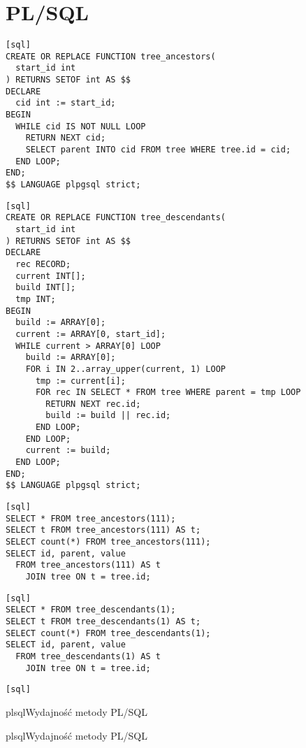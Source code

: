 \section{PL/SQL}






\begin{verbatim}[sql]
CREATE OR REPLACE FUNCTION tree_ancestors(
  start_id int
) RETURNS SETOF int AS $$
DECLARE
  cid int := start_id;
BEGIN
  WHILE cid IS NOT NULL LOOP
    RETURN NEXT cid;
    SELECT parent INTO cid FROM tree WHERE tree.id = cid;
  END LOOP;
END;
$$ LANGUAGE plpgsql strict;
\end{verbatim}

\begin{verbatim}[sql]
CREATE OR REPLACE FUNCTION tree_descendants(
  start_id int
) RETURNS SETOF int AS $$ 
DECLARE
  rec RECORD;
  current INT[];
  build INT[];
  tmp INT;
BEGIN
  build := ARRAY[0];
  current := ARRAY[0, start_id];
  WHILE current > ARRAY[0] LOOP
    build := ARRAY[0];  
    FOR i IN 2..array_upper(current, 1) LOOP
      tmp := current[i];  
      FOR rec IN SELECT * FROM tree WHERE parent = tmp LOOP
        RETURN NEXT rec.id;
        build := build || rec.id;
      END LOOP;
    END LOOP;
    current := build;
  END LOOP;
END;
$$ LANGUAGE plpgsql strict;
\end{verbatim}



\begin{verbatim}[sql]
SELECT * FROM tree_ancestors(111);
SELECT t FROM tree_ancestors(111) AS t;
SELECT count(*) FROM tree_ancestors(111);
SELECT id, parent, value
  FROM tree_ancestors(111) AS t
    JOIN tree ON t = tree.id;
\end{verbatim}



\begin{verbatim}[sql]
SELECT * FROM tree_descendants(1);
SELECT t FROM tree_descendants(1) AS t;
SELECT count(*) FROM tree_descendants(1);
SELECT id, parent, value
  FROM tree_descendants(1) AS t 
    JOIN tree ON t = tree.id;
\end{verbatim}

\begin{verbatim}[sql]

\end{verbatim}


\begin{qxtab}{plsql}{Wydajność metody PL/SQL}
\end{qxtab}

\begin{qxfig}{plsql}{Wydajność metody PL/SQL}
\end{qxfig}








